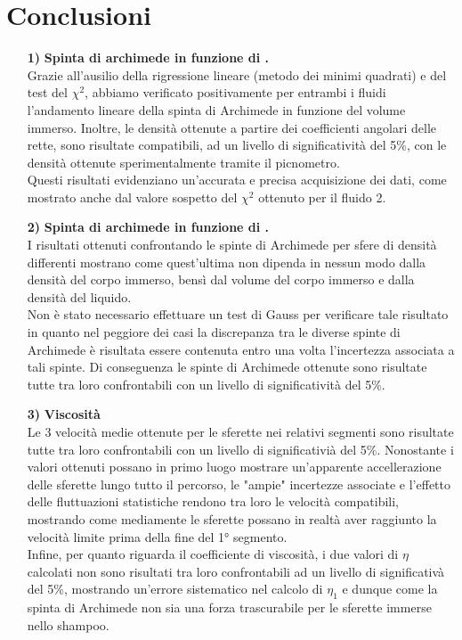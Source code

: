 \documentclass{article}
\begin{document}
\newpage \section{Conclusioni}
\begin{itemize}
    \item [\textbf{1)}]\textbf{Spinta di archimede in funzione di .} 
    \\Grazie all'ausilio della rigressione lineare (metodo dei minimi quadrati) e del test del $\chi^2$, abbiamo verificato positivamente per entrambi i fluidi l'andamento lineare della spinta di Archimede in funzione del volume immerso. Inoltre, le densità ottenute a partire dei coefficienti angolari delle rette, sono risultate compatibili, ad un livello di significatività del 5\%, con le densità ottenute sperimentalmente tramite il picnometro.
    \\Questi risultati evidenziano un'accurata e precisa acquisizione dei dati, come mostrato anche dal valore sospetto del $\chi^2$ ottenuto per il fluido 2.
    
    \item [\textbf{2)}] \textbf{Spinta di archimede in funzione di .} 
    \\I risultati ottenuti confrontando le spinte di Archimede per sfere di densità differenti mostrano come quest'ultima non dipenda in nessun modo dalla densità del corpo immerso, bensì dal volume del corpo immerso e dalla densità del liquido. 
    \\Non è stato necessario effettuare un test di Gauss per verificare tale risultato in quanto nel peggiore dei casi la discrepanza tra le diverse spinte di Archimede è risultata essere contenuta entro una volta l'incertezza associata a tali spinte. Di conseguenza le spinte di Archimede ottenute sono risultate tutte tra loro confrontabili con un livello di significatività del 5\%.

    \item [\textbf{3)}] \textbf{Viscosità} 
    \\Le 3 velocità medie ottenute per le sferette nei relativi segmenti sono risultate tutte tra loro confrontabili con un livello di significativià del 5\%. Nonostante i valori ottenuti possano in primo luogo mostrare un'apparente accellerazione delle sferette lungo tutto il percorso, le "ampie" incertezze associate e l'effetto delle fluttuazioni statistiche rendono tra loro le velocità compatibili, mostrando come mediamente le sferette possano in realtà aver raggiunto la velocità limite prima della fine del 1° segmento.
    \\Infine, per quanto riguarda il coefficiente di viscosità, i due valori di $\eta$ calcolati non sono risultati tra loro confrontabili ad un livello di significativà del 5\%, mostrando un'errore sistematico nel calcolo di $\eta_1$ e dunque come la spinta di Archimede non sia una forza trascurabile per le sferette immerse nello shampoo.
    
\end{itemize}
\end{document}

